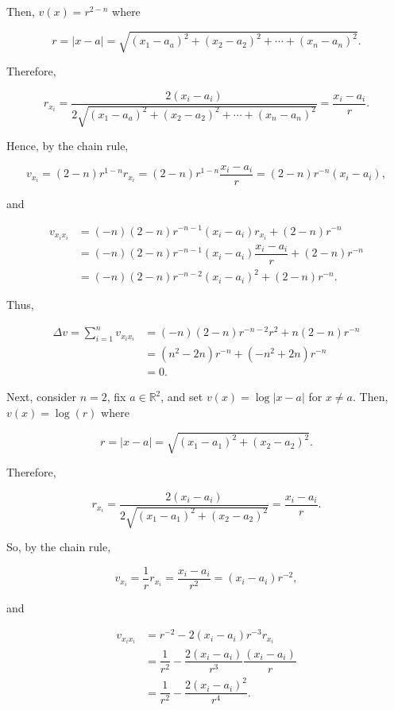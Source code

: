 \documentclass{article}
\begin{document}
Then, $v(x)=r^{2-n}$ where

$$r=|x-a|=\sqrt{(x_1-a_a)^2+(x_2-a_2)^2+\cdots + (x_n-a_n)^2}.$$

Therefore,

$$r_{x_i}=\dfrac{2(x_i-a_i)}{2\sqrt{(x_1-a_a)^2+(x_2-a_2)^2+\cdots + (x_n-a_n)^2}}=\dfrac{x_i-a_i}{r}.$$

Hence, by the chain rule,

$$v_{x_i}=(2-n)r^{1-n}r_{x_i}=(2-n)r^{1-n}\dfrac{x_i-a_i}{r}=(2-n)r^{-n}(x_i-a_i),$$

and

\begin{equation*}
\begin{split}
v_{x_ix_i}&=(-n)(2-n)r^{-n-1}(x_i-a_i)r_{x_i}+(2-n)r^{-n}\\&=(-n)(2-n)r^{-n-1}(x_i-a_i)\dfrac{x_i-a_i}{r}+(2-n)r^{-n}\\&=
(-n)(2-n)r^{-n-2}(x_i-a_i)^2+(2-n)r^{-n}.
\end{split}
\end{equation*}

Thus,

\begin{equation*}
\begin{split}
\Delta v = \sum_{i=1}^n v_{x_ix_i}&=(-n)(2-n)r^{-n-2}r^2+n(2-n)r^{-n}\\&=
(n^2-2n)r^{-n}+(-n^2+2n)r^{-n}\\&=0.
\end{split}
\end{equation*}

Next, consider $n= 2$, fix $a\in\mathbb R^2$, and set $v(x)=\log|x-a|$ for $x\neq a$. Then, $v(x)=\log(r)$ where

$$r=|x-a|=\sqrt{(x_1-a_1)^2+(x_2-a_2)^2}.$$

Therefore,

$$r_{x_i}=\dfrac{2(x_i-a_i)}{2\sqrt{(x_1-a_1)^2+(x_2-a_2)^2}}=\dfrac{x_i-a_i}{r}.$$

So, by the chain rule,

$$v_{x_i}=\dfrac{1}{r}r_{x_i}=\dfrac{x_i-a_i}{r^2}=(x_i-a_i)r^{-2},$$

and

\begin{equation*}
\begin{split}
v_{x_ix_i}&=r^{-2}-2(x_i-a_i)r^{-3}r_{x_i} \\&=
\dfrac{1}{r^2}-\dfrac{2(x_i-a_i)}{r^3}\dfrac{(x_i-a_i)}{r}  \\&=
\dfrac{1}{r^2}-\dfrac{2(x_i-a_i)^2}{r^4}.
\end{split}
\end{equation*}
\end{document}
